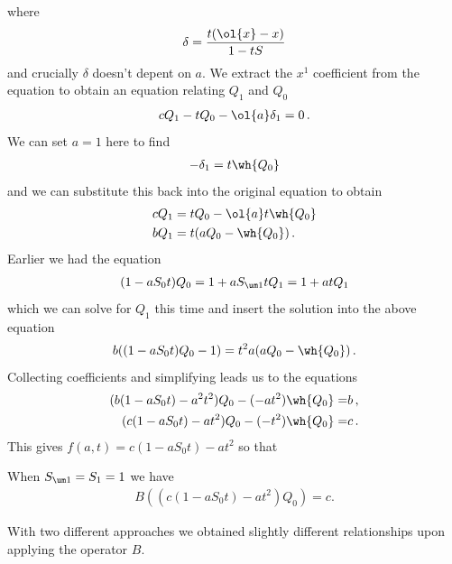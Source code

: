 where
\begin{align}
	\delta =\frac{t(\ol{x}-x)}{1-tS}
\end{align}
and crucially $\delta$ doesn't depent on $a$. We extract the $x^1$ coefficient from the equation to obtain an equation relating $Q_1$ and $Q_0$
\begin{align}
	c Q_1 - t Q_0 - \ol{a}\delta_1 = 0\,.
\end{align}
We can set $a = 1$ here to find
\begin{align}
	-\delta_1 = t \wh{Q_0}
\end{align}
and we can substitute this back into the original equation to obtain
\begin{align}
\begin{split}
	c Q_1 &= t Q_0 - \ol{a} t \wh{Q_0}\\
	b Q_1 &= t (aQ_0 - \wh{Q_0})\,.
\end{split}
\end{align}
Earlier we had the equation
\begin{align}
	(1-aS_0t)Q_0 = 1 + a S_{\um 1} t Q_1 = 1 + at Q_1
\end{align}
which we can solve for $Q_1$ this time and insert the solution into the above equation
\begin{align}
	b ((1-aS_0t)Q_0-1) = t^2 a (aQ_0 - \wh{Q_0})\,.
\end{align}
Collecting coefficients and simplifying leads us to the equations
\begin{align}
\begin{split}
	(b(1-aS_0t)-a^2 t^2) Q_0 -(-at^2)\wh{Q_0} =& b\,,\\
	(c(1-aS_0t)-a t^2) Q_0 -(-t^2)\wh{Q_0} =& c\,.
\end{split}
\end{align}
This gives $f(a,t) = c(1-aS_0t)-a t^2$ so that
\begin{prop} When $S_{\um 1} = S_1 = 1$ we have
\begin{align}
	B((c(1-aS_0t)-a t^2)Q_0) = c.
\end{align}
\end{prop}
With two different approaches we obtained slightly different relationships upon applying the operator $B$.
